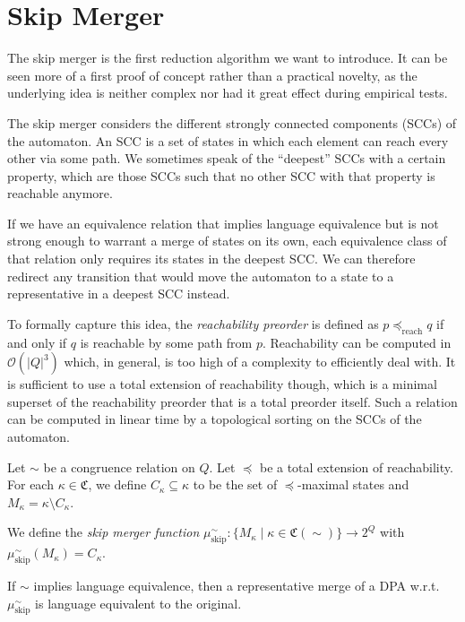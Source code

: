 
\section{Skip Merger}

The skip merger is the first reduction algorithm we want to introduce. It can be seen more of a first proof of concept rather than a practical novelty, as the underlying idea is neither complex nor had it great effect during empirical tests.

The skip merger considers the different strongly connected components (SCCs) of the automaton. An SCC is a set of states in which each element can reach every other via some path. We sometimes speak of the \enquote{deepest} SCCs with a certain property, which are those SCCs such that no other SCC with that property is reachable anymore.

If we have an equivalence relation that implies language equivalence but is not strong enough to warrant a merge of states on its own, each equivalence class of that relation only requires its states in the deepest SCC. We can therefore redirect any transition that would move the automaton to a state to a representative in a deepest SCC instead.

To formally capture this idea, the \emph{reachability preorder} is defined as $p \preceq_\text{reach} q$ if and only if $q$ is reachable by some path from $p$. Reachability can be computed in $\mathcal{O}(|Q|^3)$ which, in general, is too high of a complexity to efficiently deal with. It is sufficient to use a total extension of reachability though, which is a minimal superset of the reachability preorder that is a total preorder itself. Such a relation can be computed in linear time by a topological sorting on the SCCs of the automaton.

\begin{definition}
	Let $\sim$ be a congruence relation on $Q$. Let $\preceq$ be a total extension of reachability. For each $\kappa \in \mathfrak{C}$, we define $C_\kappa \subseteq \kappa$ to be the set of $\preceq$-maximal states and $M_\kappa = \kappa \setminus C_\kappa$.
		
	We define the \emph{skip merger function} $\mu_\text{skip}^\sim : \{ M_\kappa \mid \kappa \in \mathfrak{C}(\sim) \} \rightarrow 2^Q$ with $\mu_\text{skip}^\sim(M_\kappa) = C_\kappa$.
\end{definition}

\begin{theorem}
	If $\sim$ implies language equivalence, then a representative merge of a DPA w.r.t.\ $\mu_\text{skip}^\sim$ is language equivalent to the original.
\end{theorem}

